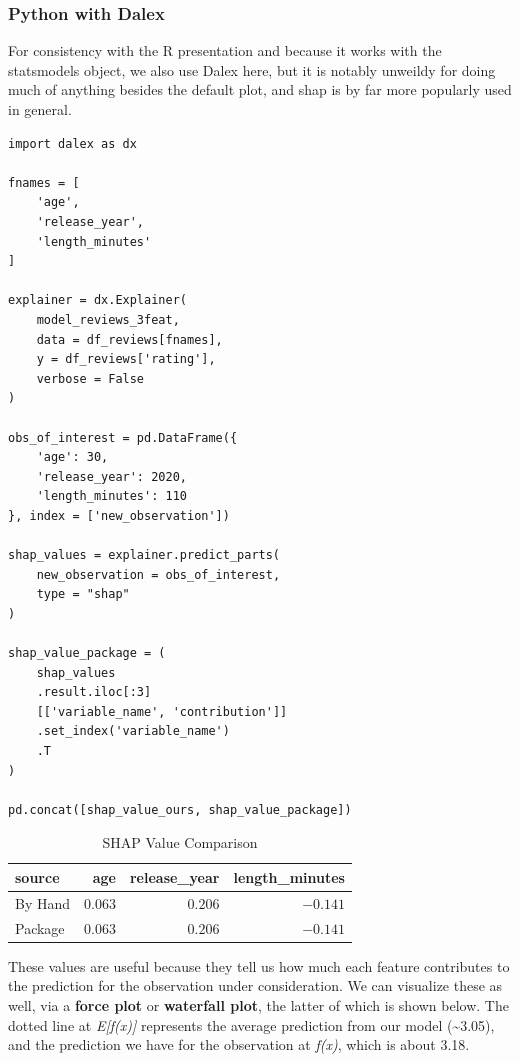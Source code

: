 \documentclass[
  letterpaper,
]{krantz}
\begin{document}
\subsubsection{Python with Dalex}

For consistency with the R presentation and because it works with the
{statsmodels} object, we also use {Dalex} here, but it is notably
unweildy for doing much of anything besides the default plot, and {shap}
is by far more popularly used in general.

\begin{verbatim}
import dalex as dx

fnames = [
    'age', 
    'release_year', 
    'length_minutes'
]

explainer = dx.Explainer(
    model_reviews_3feat, 
    data = df_reviews[fnames], 
    y = df_reviews['rating'],
    verbose = False
)

obs_of_interest = pd.DataFrame({
    'age': 30,
    'release_year': 2020,
    'length_minutes': 110
}, index = ['new_observation'])

shap_values = explainer.predict_parts(
    new_observation = obs_of_interest,
    type = "shap"
)

shap_value_package = (
    shap_values
    .result.iloc[:3]
    [['variable_name', 'contribution']]
    .set_index('variable_name')
    .T
)

pd.concat([shap_value_ours, shap_value_package])
\end{verbatim}

\begin{longtable}{lrrr}

\caption{\label{tbl-shap-values-comparison}SHAP Value Comparison}

\tabularnewline

\toprule
source & age & release\_year & length\_minutes \\ 
\midrule\addlinespace[2.5pt]
By Hand & \textcolor[HTML]{404040}{$0.063$} & \textcolor[HTML]{404040}{$0.206$} & \textcolor[HTML]{404040}{$-0.141$} \\ 
Package & \textcolor[HTML]{404040}{$0.063$} & \textcolor[HTML]{404040}{$0.206$} & \textcolor[HTML]{404040}{$-0.141$} \\ 
\bottomrule

\end{longtable}

These values are useful because they tell us how much each feature
contributes to the prediction for the observation under consideration.
We can visualize these as well, via a \textbf{force plot} or
\textbf{waterfall plot}, the latter of which is shown below. The dotted
line at \emph{E{[}f(x){]}} represents the average prediction from our
model (\textasciitilde3.05), and the prediction we have for the
observation at \emph{f(x)}, which is about 3.18.
\end{document}
